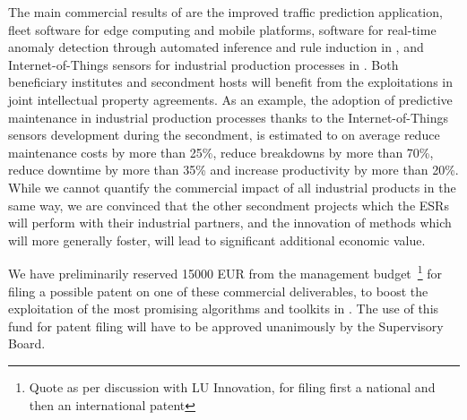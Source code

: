 The main commercial results of \acronym are the improved \ximantisentity traffic prediction application, fleet software for edge computing and mobile platforms, 
software for real-time anomaly detection through automated inference and rule induction in \ibmentity, and Internet-of-Things sensors for industrial production processes in \lightbox. Both beneficiary institutes and secondment hosts will benefit from the exploitations in joint intellectual property agreements. 
As an example, the adoption of predictive maintenance in industrial production processes thanks to the  Internet-of-Things sensors development during the \lightbox secondment, 
is estimated to on average reduce maintenance costs by more than 25\%, reduce breakdowns by more than 70\%, reduce downtime by more than 35\% and increase productivity
by more than 20\%. 
While we cannot quantify the commercial impact of all industrial products in the same way, we are convinced that the other secondment projects which the ESRs will perform with their industrial partners, and the innovation of methods which \acronym will more generally foster, will lead to significant additional economic value.

We have preliminarily reserved 15000 EUR from the management budget~\footnote{Quote as per discussion with LU Innovation, for filing first a national and then an 
international patent} for filing a possible patent on one of these commercial deliverables, to boost the exploitation of the most promising algorithms
and toolkits in \acronym. 
The use of this fund for patent filing will have to be approved unanimously by the Supervisory Board. 
